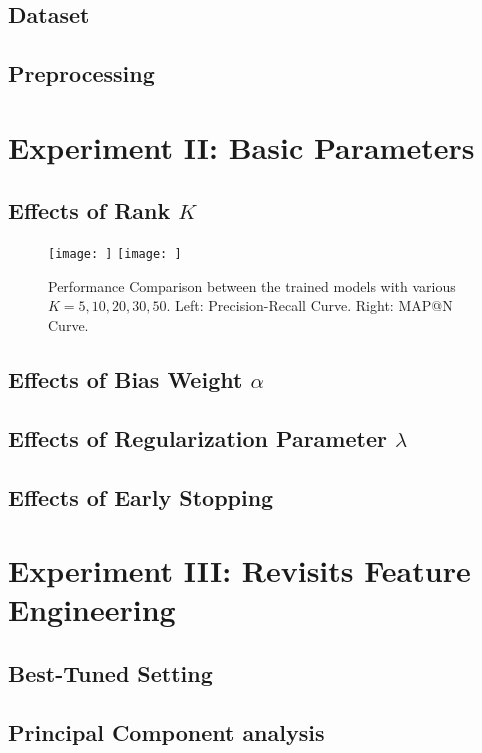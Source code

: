 \documentclass{article} %
\begin{document}
\subsection{Dataset} 

\subsection{Preprocessing}

\section{Experiment II: Basic Parameters} %

\subsection{Effects of Rank $K$}
\begin{figure}[h]
    \centering
    \texttt{[image: ]}
    \texttt{[image: ]}
    \caption{Performance Comparison between the trained models with various
        $K=5,10,20,30,50$. 
        Left: Precision-Recall Curve. Right: MAP@N Curve. }
\end{figure}

\subsection{Effects of Bias Weight $\alpha$}

\subsection{Effects of Regularization Parameter $\lambda$}

\subsection{Effects of Early Stopping}


\section{Experiment III: Revisits Feature Engineering}
\subsection{Best-Tuned Setting}

\subsection{Principal Component analysis}
\end{document}
